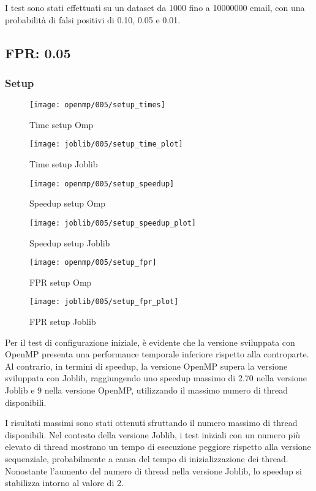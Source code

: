 I test sono stati effettuati su un dataset da 1000 fino a 10000000 email, con una probabilità di falsi positivi di
0.10, 0.05 e 0.01.

\subsection{FPR: 0.05}\label{subsec:fpr-005}
\subsubsection{Setup}\label{subsubsec:fpr-005-setup}
\begin{figure}[H]
    \centering
    \texttt{[image: openmp/005/setup\_times]}
        \caption{Time setup Omp}\label{fig:005-setup_time_omp}
    \endminipage\hfill
    \texttt{[image: joblib/005/setup\_time\_plot]}
        \caption{Time setup Joblib}\label{fig:005-setup_time_joblib}
    \endminipage\hfill
\end{figure}
\begin{figure}[H]
    \centering
    \texttt{[image: openmp/005/setup\_speedup]}
        \caption{Speedup setup Omp}\label{fig:005-setup_speedup_omp}
    \endminipage\hfill
    \texttt{[image: joblib/005/setup\_speedup\_plot]}
        \caption{Speedup setup Joblib}\label{fig:005-setup_speedup_joblib}
    \endminipage\hfill
\end{figure}
\begin{figure}[H]
    \centering
    \texttt{[image: openmp/005/setup\_fpr]}
        \caption{FPR setup Omp}\label{fig:005-setup_fpr_omp}
    \endminipage\hfill
    \texttt{[image: joblib/005/setup\_fpr\_plot]}
        \caption{FPR setup Joblib}\label{fig:005-setup_fpr_joblib}
    \endminipage\hfill
\end{figure}

Per il test di configurazione iniziale, è evidente che la versione sviluppata con OpenMP presenta una performance
temporale inferiore rispetto alla controparte.
Al contrario, in termini di speedup, la versione OpenMP supera la versione sviluppata con Joblib,
raggiungendo uno speedup massimo di 2.70 nella versione Joblib e 9 nella versione OpenMP, utilizzando il massimo
numero di thread disponibili.

I risultati massimi sono stati ottenuti sfruttando il numero massimo di thread disponibili.
Nel contesto della versione Joblib, i test iniziali con un numero più elevato di thread mostrano un tempo di esecuzione
peggiore rispetto alla versione sequenziale, probabilmente a causa del tempo di inizializzazione dei thread.
Nonostante l'aumento del numero di thread nella versione Joblib, lo speedup si stabilizza intorno al valore di 2.


